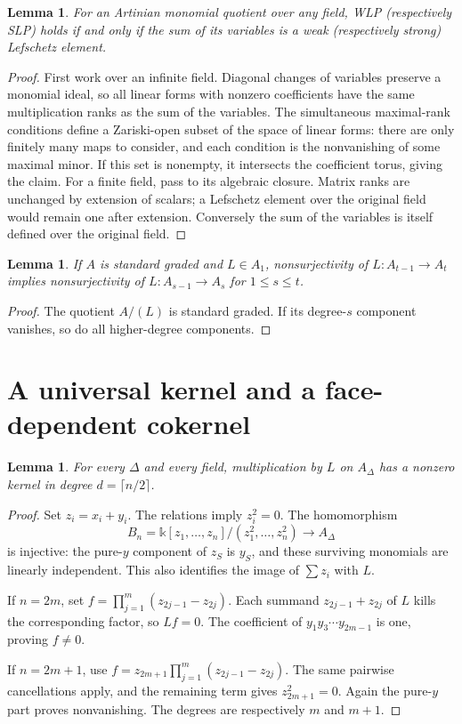 \documentclass[11pt]{article}
\newtheorem{lemma}[theorem]{Lemma}
\theoremstyle{remark}
\newcommand{\kk}{\mathbb{k}}
\newcommand{\A}{{A_{\Delta}}}
\begin{document}
\begin{lemma}\label{lem:general}
For an Artinian monomial quotient over any field, WLP (respectively SLP) holds if and only if the sum of its variables is a weak (respectively strong) Lefschetz element.
\end{lemma}
\begin{proof}
First work over an infinite field. Diagonal changes of variables preserve a monomial ideal, so all linear forms with nonzero coefficients have the same multiplication ranks as the sum of the variables. The simultaneous maximal-rank conditions define a Zariski-open subset of the space of linear forms: there are only finitely many maps to consider, and each condition is the nonvanishing of some maximal minor. If this set is nonempty, it intersects the coefficient torus, giving the claim. For a finite field, pass to its algebraic closure. Matrix ranks are unchanged by extension of scalars; a Lefschetz element over the original field would remain one after extension. Conversely the sum of the variables is itself defined over the original field.
\end{proof}

\begin{lemma}\label{lem:propagate}
If $A$ is standard graded and $L\in A_1$, nonsurjectivity of $L:A_{t-1}\to A_t$ implies nonsurjectivity of $L:A_{s-1}\to A_s$ for $1\leq s\leq t$.
\end{lemma}
\begin{proof}
The quotient $A/(L)$ is standard graded. If its degree-$s$ component vanishes, so do all higher-degree components.
\end{proof}

\section{A universal kernel and a face-dependent cokernel}
\begin{lemma}\label{lem:kernel}
For every $\Delta$ and every field, multiplication by $L$ on $\A$ has a nonzero kernel in degree $d=\lceil n/2\rceil$.
\end{lemma}
\begin{proof}
Set $z_i=x_i+y_i$. The relations imply $z_i^2=0$. The homomorphism
\[
B_n=\kk[z_1,\ldots,z_n]/(z_1^2,\ldots,z_n^2)\longrightarrow\A
\]
is injective: the pure-$y$ component of $z_S$ is $y_S$, and these surviving monomials are linearly independent. This also identifies the image of $\sum z_i$ with $L$.

If $n=2m$, set $f=\prod_{j=1}^m(z_{2j-1}-z_{2j})$. Each summand $z_{2j-1}+z_{2j}$ of $L$ kills the corresponding factor, so $Lf=0$. The coefficient of $y_1y_3\cdots y_{2m-1}$ is one, proving $f\ne0$.

If $n=2m+1$, use $f=z_{2m+1}\prod_{j=1}^m(z_{2j-1}-z_{2j})$. The same pairwise cancellations apply, and the remaining term gives $z_{2m+1}^2=0$. Again the pure-$y$ part proves nonvanishing. The degrees are respectively $m$ and $m+1$.
\end{proof}
\end{document}
